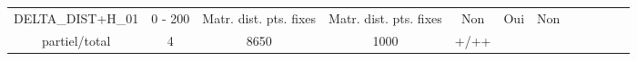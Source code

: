 \documentclass{report}
\begin{document}
\begin{landscape}
\begin{tabular}{|c|c|c|c|c|c|c|c|c|c|c|c|}
\begin{minipage}{3.5cm}\vspace{5mm}DELTA\_DIST+H\_01 \vspace{1mm} \end{minipage} &
\begin{minipage}{1.3cm}0 - 200 \end{minipage} &
\begin{minipage}{1.8cm}Matr. dist. pts. fixes \end{minipage} &
\begin{minipage}{1.8cm}Matr. dist. pts. fixes \end{minipage} &
\begin{minipage}{1.4cm}Non \end{minipage} &
\begin{minipage}{1.4cm}Oui \end{minipage} &
\begin{minipage}{2cm} Non \end{minipage} &
\begin{minipage}{1.8cm}RMSE\\ partiel/total \end{minipage}&
\begin{minipage}{1.65cm} 4 \end{minipage}&
\begin{minipage}{1.2cm} 8650 \end{minipage} &
\begin{minipage}{1cm}1000 \end{minipage} &
\begin{minipage}{0.9cm}+/++ \end{minipage} \\  \hline


\end{tabular}
\end{landscape}
\end{document}
